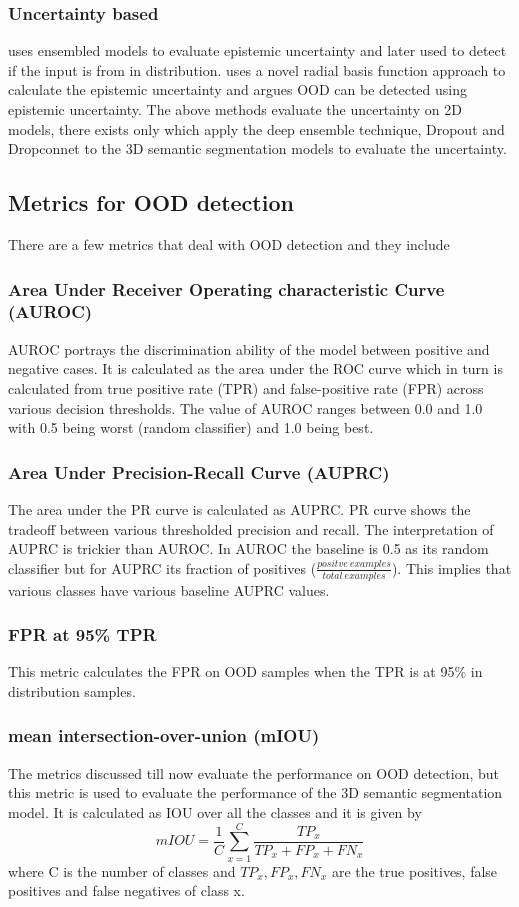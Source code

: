 \documentclass[thesis]{mas_proposal}
\begin{document}
\subsubsection{Uncertainty based}
\cite{lakshminarayanan2016simple} uses ensembled models to evaluate epistemic uncertainty and later used to detect if the input is from in distribution. 
\cite{pmlr-v119-van-amersfoort20a} uses a novel radial basis function approach to calculate the epistemic uncertainty and argues OOD can be detected using epistemic uncertainty.
The above methods evaluate the uncertainty on 2D models, there exists only \cite{bhandary2020evaluating} which apply the deep ensemble technique, Dropout and Dropconnet to the 3D semantic segmentation models to evaluate the uncertainty.

\subsection{Metrics for OOD detection}
There are a few metrics that deal with OOD detection and they include
\subsubsection{Area Under Receiver Operating characteristic Curve (AUROC)}
AUROC portrays the discrimination ability of the model between positive and negative cases. 
It is calculated as the area under the ROC curve which in turn is calculated from true positive rate (TPR) and false-positive rate (FPR) across various decision thresholds.
The value of AUROC ranges between 0.0 and 1.0 with 0.5 being worst (random classifier) and 1.0 being best.
\subsubsection{Area Under Precision-Recall Curve (AUPRC)}
The area under the PR curve is calculated as AUPRC. 
PR curve shows the tradeoff between various thresholded precision and recall.
The interpretation of AUPRC is trickier than AUROC. 
In AUROC the baseline is 0.5 as its random classifier but for AUPRC its fraction of positives ($\frac{positve\ examples}{total\ examples}$).
This implies that various classes have various baseline AUPRC values.
\subsubsection{FPR at 95\% TPR}
This metric calculates the FPR on OOD samples when the TPR is at 95\% in distribution samples.
\subsubsection{mean intersection-over-union (mIOU)}
The metrics discussed till now evaluate the performance on OOD detection, but this metric is used to evaluate the performance of the 3D semantic segmentation model.
It is calculated as IOU over all the classes and it is given by
$$
    mIOU=\frac{1}{C} \sum_{x=1}^C \frac{TP_x}{TP_x + FP_x + FN_x}
$$
where C is the number of classes and $TP_x, FP_x, FN_x$ are the true positives, false positives and false negatives of class x.
\end{document}
